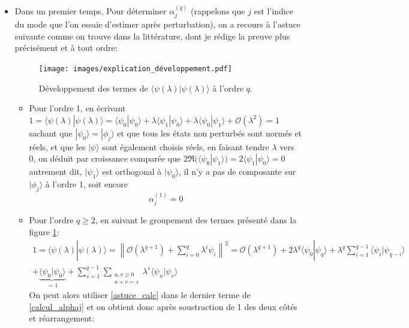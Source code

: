 \documentclass[svgnames,dvipsnames,a4paper,10pt,french]{report}
\begin{document}
\begin{itemize}
    \item Dans un premier temps, Pour déterminer $\alpha_j^{(q)}$ (rappelons que $j$ est l'indice du mode que l'on essaie d'estimer après perturbation), on a recours à l'astuce suivante comme on trouve dans la littérature, dont je rédige la preuve plus précisément et à tout ordre:


\begin{figure}[H]
    \centering
    \texttt{[image: images/explication\_développement.pdf]}
    \caption{Développement des termes de $\langle \psi(\lambda )| \psi(\lambda ) \rangle$ à l'ordre $q$.}
    \label{fig:explications_dvp}
\end{figure}


\begin{itemize}
    \item Pour l'ordre 1, en écrivant $1= \langle \psi(\lambda )| \psi(\lambda ) \rangle = \langle \psi_0| \psi_0 \rangle + \lambda \langle \psi_1 | \psi_0 \rangle + \lambda \langle \psi_0 | \psi_1 \rangle + \mathcal{O}(\lambda^2) = 1$ sachant que $|\psi_0\rangle = |\phi_j\rangle$ et que tous les états non perturbés sont normés et réels, et que les $|\psi\rangle$ sont également choisis réels,  en faisant tendre $\lambda$ vers 0, on déduit par croissance comparée que $2\Re (\langle \psi_0 | \psi_1 \rangle) = 2 \langle \psi_1 | \psi_0 \rangle = 0$ autrement dit, $| \psi_1 \rangle$ est orthogonal à $| \psi_0 \rangle$, il n'y a pas de composante sur $|\phi_j\rangle$ à l'ordre 1, soit encore 
    \begin{equation}
        \boxed{\alpha_j^{(1)} =  0}
    \end{equation}
    \item Pour l'ordre $q \ge 2$, en suivant le groupement des termes présenté dans la figure \ref{fig:explications_dvp}: 
    \begin{multline}
    \label{calcul_alphaj}
        1 = \langle \psi(\lambda )| \psi(\lambda ) \rangle = \left\| \mathcal{O}(\lambda^{q+1}) +  \sum_{i=0}^q \lambda^i \psi_i  \right\|^2 = \mathcal{O}(\lambda^{q+1}) + 2 \lambda^q \langle \psi_0 | \psi_q\rangle + \lambda^q \sum_{i=1}^{q-1} \langle \psi_i |\psi_{q-i} \rangle \\
        + \underbrace{\langle \psi_0 | \psi_0 \rangle}_{=1} + \sum_{s=1}^{q-1} \sum_{\substack{u,v \ge 0 \\ u+v=s}} \lambda^s \langle \psi_u | \psi_v \rangle 
    \end{multline}
    On peut alors utiliser  \ref{astuce_calc} dans le dernier terme de \ref{calcul_alphaj} et on obtient donc après soustraction de 1 des deux côtés et réarrangement:

\end{itemize}
\end{itemize}
\end{document}
